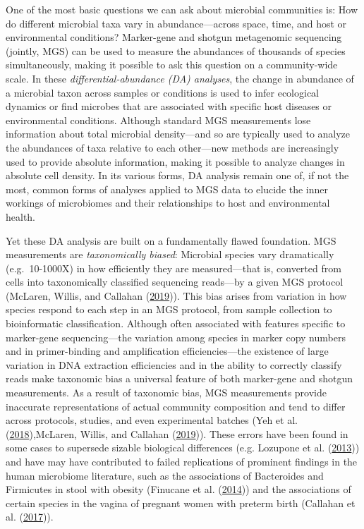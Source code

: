 \documentclass[
]{article}
\begin{document}
One of the most basic questions we can ask about microbial communities is: How do different microbial taxa vary in abundance---across space, time, and host or environmental conditions?
Marker-gene and shotgun metagenomic sequencing (jointly, MGS) can be used to measure the abundances of thousands of species simultaneously, making it possible to ask this question on a community-wide scale.
In these \emph{differential-abundance (DA) analyses}, the change in abundance of a microbial taxon across samples or conditions is used to infer ecological dynamics or find microbes that are associated with specific host diseases or environmental conditions.
Although standard MGS measurements lose information about total microbial density---and so are typically used to analyze the abundances of taxa relative to each other---new methods are increasingly used to provide absolute information, making it possible to analyze changes in absolute cell density.
In its various forms, DA analysis remain one of, if not the most, common forms of analyses applied to MGS data to elucide the inner workings of microbiomes and their relationships to host and environmental health.

Yet these DA analysis are built on a fundamentally flawed foundation.
MGS measurements are \emph{taxonomically biased}: Microbial species vary dramatically (e.g.~10-1000X) in how efficiently they are measured---that is, converted from cells into taxonomically classified sequencing reads---by a given MGS protocol (McLaren, Willis, and Callahan (\protect\hyperlink{ref-mclaren2019cons}{2019})).
This bias arises from variation in how species respond to each step in an MGS protocol, from sample collection to bioinformatic classification.
Although often associated with features specific to marker-gene sequencing---the variation among species in marker copy numbers and in primer-binding and amplification efficiencies---the existence of large variation in DNA extraction efficiencies and in the ability to correctly classify reads make taxonomic bias a universal feature of both marker-gene and shotgun measurements.
As a result of taxonomic bias, MGS measurements provide inaccurate representations of actual community composition and tend to differ across protocols, studies, and even experimental batches (Yeh et al. (\protect\hyperlink{ref-yeh2018taxo}{2018}),McLaren, Willis, and Callahan (\protect\hyperlink{ref-mclaren2019cons}{2019})).
These errors have been found in some cases to supersede sizable biological differences (e.g. Lozupone et al. (\protect\hyperlink{ref-lozupone2013meta}{2013})) and have may have contributed to failed replications of prominent findings in the human microbiome literature, such as the associations of Bacteroides and Firmicutes in stool with obesity (Finucane et al. (\protect\hyperlink{ref-finucane2014atax}{2014})) and the associations of certain species in the vagina of pregnant women with preterm birth (Callahan et al. (\protect\hyperlink{ref-callahan2017repl}{2017})).
\end{document}
